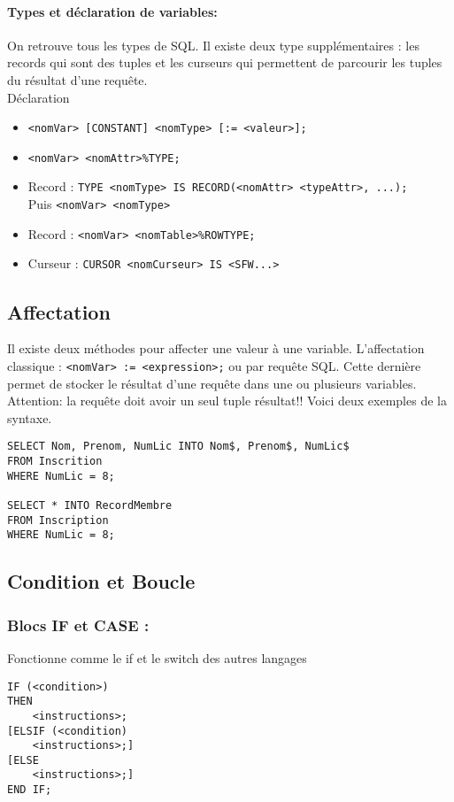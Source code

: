 \documentclass[10pt,a4paper,twoside]{article}
\begin{document}
\paragraph{Types et déclaration de variables:} On retrouve tous les types de SQL. Il existe deux type supplémentaires : les records qui sont des tuples et les curseurs qui permettent de parcourir les tuples du résultat d'une requête. \\
Déclaration
\begin{itemize}
\item \verb$<nomVar> [CONSTANT] <nomType> [:= <valeur>];$
\item \verb=<nomVar> <nomAttr>%TYPE;=
\item Record : \verb=TYPE <nomType> IS RECORD(<nomAttr> <typeAttr>, ...);=\\
Puis \verb=<nomVar> <nomType>=
\item Record : \verb=<nomVar> <nomTable>%ROWTYPE;=
\item Curseur : \verb=CURSOR <nomCurseur> IS <SFW...>=
\end{itemize}

\subsection{Affectation}
 Il existe deux méthodes pour affecter une valeur à une variable. L'affectation classique : \verb$<nomVar> := <expression>;$ ou par requête SQL. Cette dernière permet de stocker le résultat d'une requête dans une ou plusieurs variables. Attention: la requête doit avoir un seul tuple résultat!! Voici deux exemples de la syntaxe. 
\begin{verbatim}
SELECT Nom, Prenom, NumLic INTO Nom$, Prenom$, NumLic$
FROM Inscrition
WHERE NumLic = 8;

SELECT * INTO RecordMembre
FROM Inscription
WHERE NumLic = 8;
\end{verbatim}

\subsection{Condition et Boucle}
\subsubsection{Blocs IF et CASE :} Fonctionne comme le if et le switch des autres langages

\begin{verbatim}
IF (<condition>)
THEN
    <instructions>;
[ELSIF (<condition)
    <instructions>;]
[ELSE
    <instructions>;]
END IF;
\end{verbatim}
\end{document}
